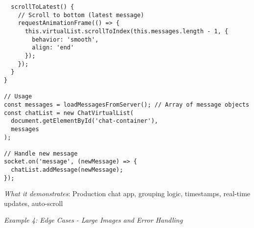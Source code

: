 \documentclass[11pt]{article}
\begin{document}
\begin{verbatim}
  scrollToLatest() {
    // Scroll to bottom (latest message)
    requestAnimationFrame(() => {
      this.virtualList.scrollToIndex(this.messages.length - 1, { 
        behavior: 'smooth',
        align: 'end'
      });
    });
  }
}

// Usage
const messages = loadMessagesFromServer(); // Array of message objects
const chatList = new ChatVirtualList(
  document.getElementById('chat-container'),
  messages
);

// Handle new message
socket.on('message', (newMessage) => {
  chatList.addMessage(newMessage);
});
\end{verbatim}

\emph{What it demonstrates}: Production chat app, grouping logic, timestamps, real-time updates, auto-scroll

\emph{Example 4: Edge Cases - Large Images and Error Handling}
\end{document}
